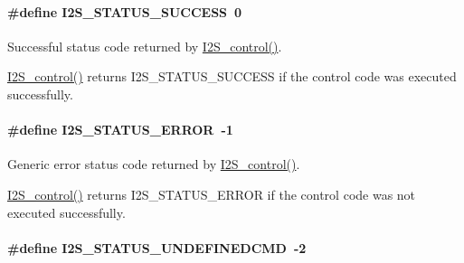 \paragraph[{I2\+S\+\_\+\+S\+T\+A\+T\+U\+S\+\_\+\+S\+U\+C\+C\+E\+S\+S}]{\setlength{\rightskip}{0pt plus 5cm}\#define I2\+S\+\_\+\+S\+T\+A\+T\+U\+S\+\_\+\+S\+U\+C\+C\+E\+S\+S~0}\label{_i2_s_8h_a23118b46858671b6537d3a68721f0282}


Successful status code returned by \hyperlink{_i2_s_8h_a1af19b22e9036bee696b4e4efe4916b0}{I2\+S\+\_\+control()}. 

\hyperlink{_i2_s_8h_a1af19b22e9036bee696b4e4efe4916b0}{I2\+S\+\_\+control()} returns I2\+S\+\_\+\+S\+T\+A\+T\+U\+S\+\_\+\+S\+U\+C\+C\+E\+S\+S if the control code was executed successfully. 
\paragraph[{I2\+S\+\_\+\+S\+T\+A\+T\+U\+S\+\_\+\+E\+R\+R\+O\+R}]{\setlength{\rightskip}{0pt plus 5cm}\#define I2\+S\+\_\+\+S\+T\+A\+T\+U\+S\+\_\+\+E\+R\+R\+O\+R~-\/1}\label{_i2_s_8h_a775a6dc5aa644d4cca2179afbafb63ad}


Generic error status code returned by \hyperlink{_i2_s_8h_a1af19b22e9036bee696b4e4efe4916b0}{I2\+S\+\_\+control()}. 

\hyperlink{_i2_s_8h_a1af19b22e9036bee696b4e4efe4916b0}{I2\+S\+\_\+control()} returns I2\+S\+\_\+\+S\+T\+A\+T\+U\+S\+\_\+\+E\+R\+R\+O\+R if the control code was not executed successfully. 
\paragraph[{I2\+S\+\_\+\+S\+T\+A\+T\+U\+S\+\_\+\+U\+N\+D\+E\+F\+I\+N\+E\+D\+C\+M\+D}]{\setlength{\rightskip}{0pt plus 5cm}\#define I2\+S\+\_\+\+S\+T\+A\+T\+U\+S\+\_\+\+U\+N\+D\+E\+F\+I\+N\+E\+D\+C\+M\+D~-\/2}\label{_i2_s_8h_a649cf0c869381728fc9b56dfdbbd3e3d}


